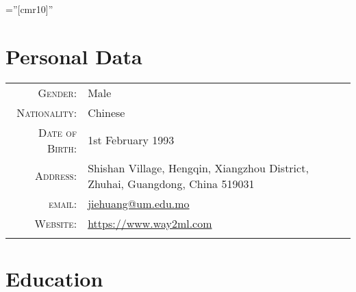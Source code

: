 \documentclass[a4paper,10pt]{article} %
\begin{document}
\font\fb=''[cmr10]'' %

\par{\bigskip\par} %

\section{Personal Data}

\begin{tabular}{rl}
\textsc{Gender:}                  	& Male \\
\textsc{Nationality:}               & Chinese \\
\textsc{Date of Birth:} 	        & 1st February 1993  \\
\textsc{Address:} 					& Shishan Village, Hengqin, Xiangzhou District, Zhuhai, Guangdong, China 519031  \\
\textsc{email:} 					& 
\href{mailto:jiehuang@um.edu.mo}{jiehuang@um.edu.mo} \\
\textsc{Website:}                   & \href{https://www.way2ml.com}{https://www.way2ml.com}\\
\multicolumn{2}{c}{} \\	%
\end{tabular}



\section{Education}
\end{document}
